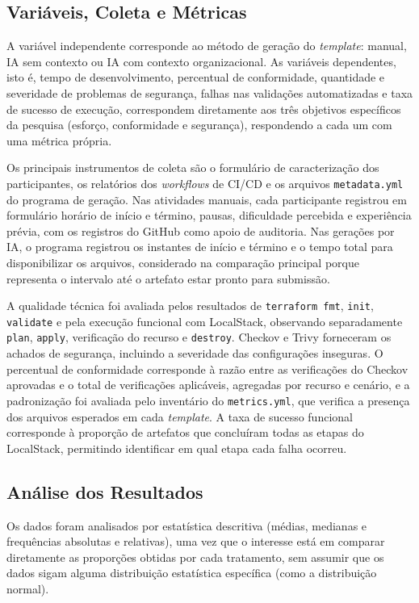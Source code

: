 \subsection{Variáveis, Coleta e Métricas}

A variável independente corresponde ao método de geração do \textit{template}: manual, IA sem contexto ou IA com contexto organizacional. As variáveis dependentes, isto é, tempo de desenvolvimento, percentual de conformidade, quantidade e severidade de problemas de segurança, falhas nas validações automatizadas e taxa de sucesso de execução, correspondem diretamente aos três objetivos específicos da pesquisa (esforço, conformidade e segurança), respondendo a cada um com uma métrica própria.

Os principais instrumentos de coleta são o formulário de caracterização dos participantes, os relatórios dos \textit{workflows} de CI/CD e os arquivos \texttt{metadata.yml} do programa de geração. Nas atividades manuais, cada participante registrou em formulário horário de início e término, pausas, dificuldade percebida e experiência prévia, com os registros do GitHub como apoio de auditoria. Nas gerações por IA, o programa registrou os instantes de início e término e o tempo total para disponibilizar os arquivos, considerado na comparação principal porque representa o intervalo até o artefato estar pronto para submissão.

A qualidade técnica foi avaliada pelos resultados de \texttt{terraform fmt}, \texttt{init}, \texttt{validate} e pela execução funcional com LocalStack, observando separadamente \texttt{plan}, \texttt{apply}, verificação do recurso e \texttt{destroy}. Checkov e Trivy forneceram os achados de segurança, incluindo a severidade das configurações inseguras. O percentual de conformidade corresponde à razão entre as verificações do Checkov aprovadas e o total de verificações aplicáveis, agregadas por recurso e cenário, e a padronização foi avaliada pelo inventário do \texttt{metrics.yml}, que verifica a presença dos arquivos esperados em cada \textit{template}. A taxa de sucesso funcional corresponde à proporção de artefatos que concluíram todas as etapas do LocalStack, permitindo identificar em qual etapa cada falha ocorreu.

\subsection{Análise dos Resultados}

Os dados foram analisados por estatística descritiva (médias, medianas e frequências absolutas e relativas), uma vez que o interesse está em comparar diretamente as proporções obtidas por cada tratamento, sem assumir que os dados sigam alguma distribuição estatística específica (como a distribuição normal).

